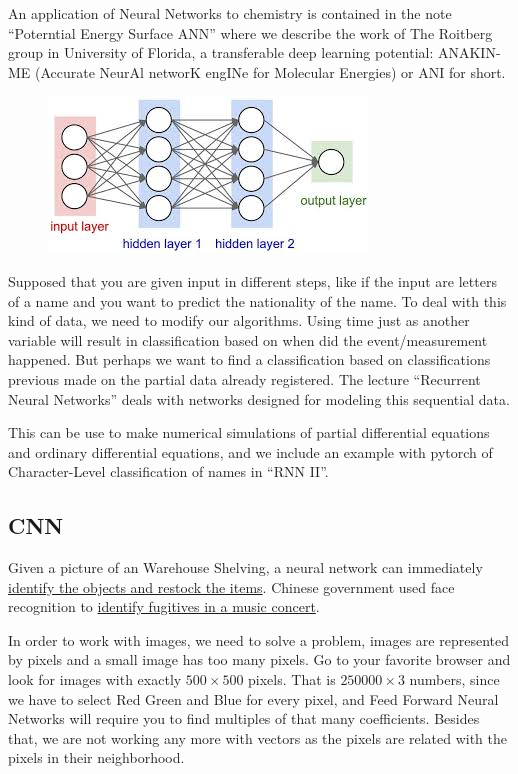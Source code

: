 \documentclass[11pt,letterpaper]{report}
\begin{document}
	
	An application of Neural Networks to chemistry is contained in the note ``Poterntial Energy Surface ANN'' where we describe the work of The Roitberg group in University of Florida, a transferable deep learning potential: ANAKIN-ME (Accurate NeurAl networK engINe for Molecular Energies) or ANI for short.
	
    	\begin{figure}[h!]
    	\centering
    	\includegraphics[width=0.45\linewidth]{figures/nn.jpg}
    	\caption{}
    	\label{fig:nn}
    \end{figure} 	
    
    Supposed that you are given  input in different steps, like if the input are letters of a name and you want to predict the nationality of the name. To deal with this kind of data, we need to modify our algorithms. Using time just as another variable will result in classification based on when did the event/measurement happened. But perhaps we want to find a classification based on classifications previous made on the partial data already registered. The lecture ``Recurrent Neural Networks'' deals with networks designed for modeling this sequential data.  
    
    This can be use to make numerical simulations of partial differential equations and ordinary differential equations, and we include an example with pytorch of Character-Level classification of names in ``RNN II''.

	\subsection{CNN}
	
	Given a picture of an Warehouse Shelving, a  neural network can immediately 
	\href{https://developers.google.com/machine-learning/crash-course/fairness/video-lecture?utm_source=keyword-blog&utm_medium=blog&utm_campaign=mle-outreach&utm_term=&utm_content=mlcc-fairness}{identify the objects and restock the items}.
	Chinese government used face recognition to \href{http://fortune.com/2018/10/28/in-china-facial-recognition-tech-is-watching-you/}{identify fugitives in a music concert}.
	
	In order to work with images, we need to solve a problem, images are represented by pixels and a small image has too many pixels. Go to your favorite browser and look for images with exactly  $500\times500$ pixels. That is $250000\times3$ numbers, since we have to select Red Green and Blue for every pixel, and Feed Forward Neural Networks will require you to find multiples of that many coefficients. Besides that, we are not working any more with vectors as the pixels are related with the pixels in their neighborhood.
	
\end{document}
